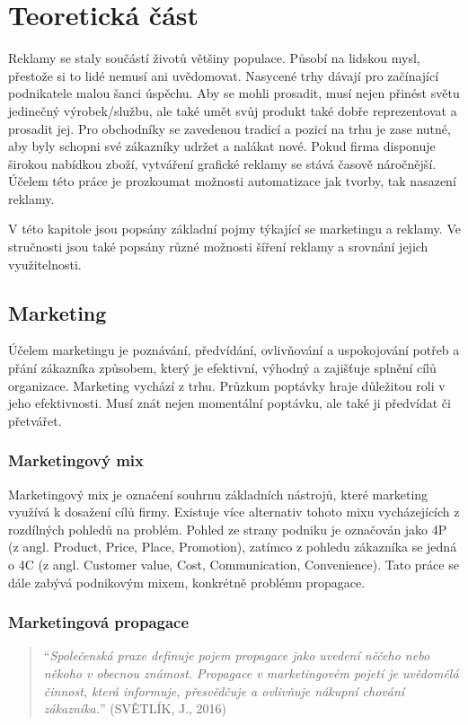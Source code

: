 \chapter{Teoretická část}
\label{chap:theoretical}
Reklamy se staly součástí životů většiny populace. Působí na lidskou mysl, přestože si to lidé nemusí ani uvědomovat.
Nasycené trhy dávají pro začínající podnikatele malou šanci úspěchu. Aby se mohli prosadit, musí nejen přinést světu jedinečný výrobek/službu,
ale také umět svůj produkt také dobře reprezentovat a prosadit jej. Pro obchodníky se zavedenou tradicí a pozicí na trhu je zase nutné,
aby byly schopni své zákazníky udržet a nalákat nové. Pokud firma disponuje širokou nabídkou zboží,
vytváření grafické reklamy se stává časově náročnější.
Účelem této práce je prozkoumat možnosti automatizace jak tvorby, tak nasazení reklamy. 

V této kapitole jsou popsány základní pojmy týkající se marketingu a reklamy. Ve stručnosti jsou také popsány různé možnosti šíření reklamy
a srovnání jejich využitelnosti.

\section{Marketing}
\label{sec:marketing}
Účelem marketingu je poznávání, předvídání, ovlivňování a uspokojování potřeb a přání zákazníka způsobem, který je efektivní, výhodný a zajišťuje splnění
cílů organizace. Marketing vychází z trhu. Průzkum poptávky hraje důležitou roli v jeho efektivnosti.
Musí znát nejen momentální poptávku, ale také ji předvídat či přetvářet.

    \subsection{Marketingový mix}\label{ssec:marketing-mix}
    Marketingový mix je označení souhrnu základních nástrojů, které marketing využívá k dosažení cílů firmy.
    Existuje více alternativ tohoto mixu vycházejících z rozdílných pohledů na problém.
    Pohled ze strany podniku je označován jako 4P (z angl. Product, Price, Place, Promotion),
    zatímco z pohledu zákazníka se jedná o 4C (z angl. Customer value, Cost, Communication, Convenience).
    Tato práce se dále zabývá podnikovým mixem, konkrétně problému propagace.

    \subsection{Marketingová propagace}\label{ssec:marketing-propagation}
    \begin{quote}
        \enquote{\emph{Společenská praxe definuje pojem propagace jako uvedení něčeho nebo někoho v obecnou známost.
        Propagace v marketingovém pojetí je uvědomělá činnost, která informuje, přesvědčuje a ovlivňuje nákupní chování zákazníka.}}
        (SVĚTLÍK, J., 2016) \cite{svetlik:marketing}
    \end{quote}

